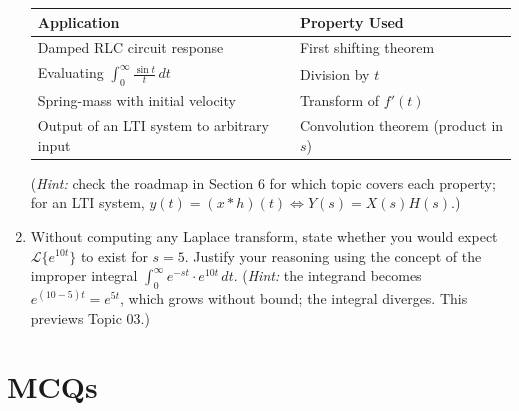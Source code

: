\documentclass[12pt,a4paper]{article}
\begin{document}
\begin{enumerate}[label=\textbf{P\arabic*.}, leftmargin=*, itemsep=6pt]
        \begin{center}
        \begin{tabular}{@{}ll@{}}
        \toprule
        \textbf{Application} & \textbf{Property Used} \\
        \midrule
        Damped RLC circuit response & First shifting theorem \\
        Evaluating $\int_0^\infty \frac{\sin t}{t}\,dt$ & Division by $t$ \\
        Spring-mass with initial velocity & Transform of $f'(t)$ \\
        Output of an LTI system to arbitrary input & Convolution theorem (product in $s$) \\
        \bottomrule
        \end{tabular}
        \end{center}
        (\textit{Hint:} check the roadmap in Section 6 for which topic covers
        each property; for an LTI system, $y(t) = (x * h)(t) \iff Y(s) = X(s)H(s)$.)

  \item Without computing any Laplace transform, state whether you would
        expect $\mathcal{L}\{e^{10t}\}$ to exist for $s = 5$.  Justify your
        reasoning using the concept of the improper integral
        $\int_0^\infty e^{-st} \cdot e^{10t}\,dt$.
        (\textit{Hint:} the integrand becomes $e^{(10-5)t} = e^{5t}$, which
        grows without bound; the integral diverges.  This previews Topic 03.)

\end{enumerate}

\section{MCQs}
\end{document}
